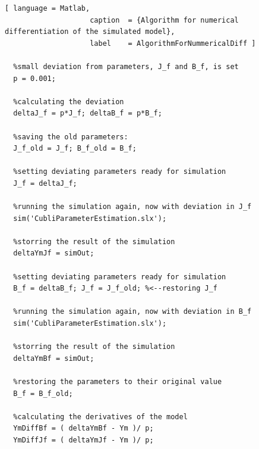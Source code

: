\begin{lstlisting}[ language = Matlab,
                    caption  = {Algorithm for numerical differentiation of the simulated model},
                    label    = AlgorithmForNummericalDiff ]

  %small deviation from parameters, J_f and B_f, is set
  p = 0.001;
  
  %calculating the deviation
  deltaJ_f = p*J_f; deltaB_f = p*B_f;
  
  %saving the old parameters:
  J_f_old = J_f; B_f_old = B_f;
  
  %setting deviating parameters ready for simulation
  J_f = deltaJ_f;
  
  %running the simulation again, now with deviation in J_f
  sim('CubliParameterEstimation.slx');
  
  %storring the result of the simulation
  deltaYmJf = simOut;
  
  %setting deviating parameters ready for simulation
  B_f = deltaB_f; J_f = J_f_old; %<--restoring J_f
  
  %running the simulation again, now with deviation in B_f
  sim('CubliParameterEstimation.slx');
  
  %storring the result of the simulation
  deltaYmBf = simOut;
  
  %restoring the parameters to their original value
  B_f = B_f_old;
  
  %calculating the derivatives of the model
  YmDiffBf = ( deltaYmBf - Ym )/ p;
  YmDiffJf = ( deltaYmJf - Ym )/ p;
\end{lstlisting}

